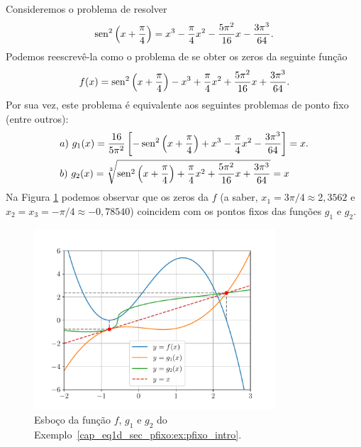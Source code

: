\begin{ex}\label{cap_eq1d_sec_pfixo:ex:pfixo_intro}
  Consideremos o problema de resolver
  \begin{equation}
    \operatorname{sen}^2\left(x+\frac{\pi}{4}\right) = x^3 - \frac{\pi}{4}x^2 - \frac{5\pi^2}{16}x - \frac{3\pi^3}{64}.
  \end{equation}
Podemos reescrevê-la como o problema de se obter os zeros da seguinte função
\begin{equation}
  f(x) = \operatorname{sen}^2\left(x+\frac{\pi}{4}\right) - x^3 + \frac{\pi}{4}x^2 + \frac{5\pi^2}{16}x + \frac{3\pi^3}{64}.
\end{equation}
Por sua vez, este problema é equivalente aos seguintes problemas de ponto fixo (entre outros):
\begin{align}
  &a)~g_1(x) = \frac{16}{5\pi^2}\left[-\operatorname{sen}^2\left(x+\frac{\pi}{4}\right) + x^3 - \frac{\pi}{4}x^2 - \frac{3\pi^3}{64}\right] = x.\\
  &b)~g_2(x) = \sqrt[3]{\operatorname{sen}^2\left(x+\frac{\pi}{4}\right) + \frac{\pi}{4}x^2 + \frac{5\pi^2}{16}x + \frac{3\pi^3}{64}} = x
\end{align}
Na Figura \ref{cap_eq1d_sec_pfixo:fig:ex_pfixo_intro} podemos observar que os zeros da $f$ (a saber, $x_1=3\pi/4\approx 2,3562$ e $x_2=x_3=-\pi/4\approx -0,78540$) coincidem com os pontos fixos das funções $g_1$ e $g_2$.

\begin{figure}[H]
  \centering
  \includegraphics[width=0.8\textwidth]{./cap_eq1d/dados/fig_ex_pfixo_intro/fig}
  \caption{Esboço da função $f$, $g_1$ e $g_2$ do Exemplo~\ref{cap_eq1d_sec_pfixo:ex:pfixo_intro}.}
  \label{cap_eq1d_sec_pfixo:fig:ex_pfixo_intro}
\end{figure}
\end{ex}

